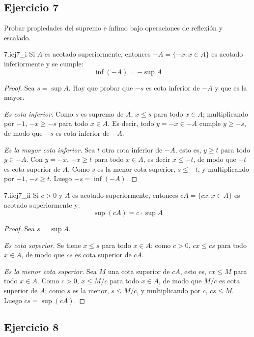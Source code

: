 \documentclass[11pt, a4paper]{article}
\begin{document}
\subsection*{Ejercicio 7}

Probar propiedades del supremo e ínfimo bajo operaciones de reflexión y escalado.

\begin{proposicion}{7.i}{ej7_i}
Si $A$ es acotado superiormente, entonces $-A = \{-x : x \in A\}$ es acotado inferiormente y se
cumple:
$$ \inf(-A) = -\sup A $$
\end{proposicion}

\begin{proof}
Sea $s = \sup A$. Hay que probar que $-s$ es cota inferior de $-A$ y que es la mayor.

\textit{Es cota inferior.} Como $s$ es supremo de $A$, $x \le s$ para todo $x \in A$; multiplicando
por $-1$, $-x \ge -s$ para todo $x \in A$. Es decir, todo $y = -x \in -A$ cumple $y \ge -s$, de modo que
$-s$ es cota inferior de $-A$.

\textit{Es la mayor cota inferior.} Sea $t$ otra cota inferior de $-A$, esto es, $y \ge t$ para todo
$y \in -A$. Con $y = -x$, $-x \ge t$ para todo $x \in A$, es decir $x \le -t$, de modo que $-t$ es
cota superior de $A$. Como $s$ es la menor cota superior, $s \le -t$, y multiplicando por $-1$,
$-s \ge t$. Luego $-s = \inf(-A)$.
\end{proof}

\begin{proposicion}{7.ii}{ej7_ii}
Si $c > 0$ y $A$ es acotado superiormente, entonces $cA = \{cx : x \in A\}$ es acotado superiormente
y:
$$ \sup(cA) = c \cdot \sup A $$
\end{proposicion}

\begin{proof}
Sea $s = \sup A$.

\textit{Es cota superior.} Se tiene $x \le s$ para todo $x \in A$; como $c > 0$, $cx \le cs$ para
todo $x \in A$, de modo que $cs$ es cota superior de $cA$.

\textit{Es la menor cota superior.} Sea $M$ una cota superior de $cA$, esto es, $cx \le M$ para todo
$x \in A$. Como $c > 0$, $x \le M/c$ para todo $x \in A$, de modo que $M/c$ es cota superior de $A$;
como $s$ es la menor, $s \le M/c$, y multiplicando por $c$, $cs \le M$. Luego $cs = \sup(cA)$.
\end{proof}

\subsection*{Ejercicio 8}
\end{document}
